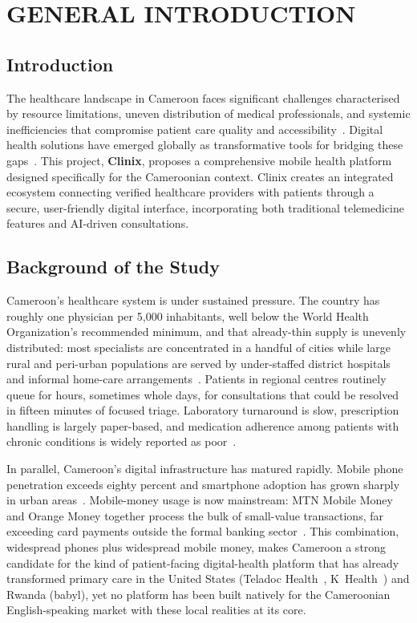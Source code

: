 \chapter{GENERAL INTRODUCTION}

\section{Introduction}

The healthcare landscape in Cameroon faces significant challenges characterised by resource limitations, uneven distribution of medical professionals, and systemic inefficiencies that compromise patient care quality and accessibility~\cite{minsante_2020}. Digital health solutions have emerged globally as transformative tools for bridging these gaps~\cite{who2019telemedicine,kvedar2014connected}. This project, \textbf{Clinix}, proposes a comprehensive mobile health platform designed specifically for the Cameroonian context. Clinix creates an integrated ecosystem connecting verified healthcare providers with patients through a secure, user-friendly digital interface, incorporating both traditional telemedicine features and AI-driven consultations.

\section{Background of the Study}

Cameroon's healthcare system is under sustained pressure. The country has roughly one physician per 5{,}000 inhabitants, well below the World Health Organization's recommended minimum, and that already-thin supply is unevenly distributed: most specialists are concentrated in a handful of cities while large rural and peri-urban populations are served by under-staffed district hospitals and informal home-care arrangements~\cite{minsante_2020}. Patients in regional centres routinely queue for hours, sometimes whole days, for consultations that could be resolved in fifteen minutes of focused triage. Laboratory turnaround is slow, prescription handling is largely paper-based, and medication adherence among patients with chronic conditions is widely reported as poor~\cite{wamala2013barriers}.

In parallel, Cameroon's digital infrastructure has matured rapidly. Mobile phone penetration exceeds eighty percent and smartphone adoption has grown sharply in urban areas~\cite{itu2023digital}. Mobile-money usage is now mainstream: MTN Mobile Money and Orange Money together process the bulk of small-value transactions, far exceeding card payments outside the formal banking sector~\cite{gsma2023mobilemoney}. This combination, widespread phones plus widespread mobile money, makes Cameroon a strong candidate for the kind of patient-facing digital-health platform that has already transformed primary care in the United States (Teladoc Health~\cite{teladoc}, K~Health~\cite{k_health}) and Rwanda (babyl), yet no platform has been built natively for the Cameroonian English-speaking market with these local realities at its core.

